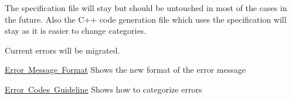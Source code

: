 The specification file will stay but should be untouched in most of the cases in the future. Also the C++ code generation file which uses the specification will stay as it is easier to change categories.

Current errors will be migrated.


\begin{DoxyItemize}
\item \mbox{\hyperlink{doc_decisions_error_message_format_md}{Error Message Format}} Shows the new format of the error message
\item \mbox{\hyperlink{doc_dev_error-categorization_md}{Error Codes Guideline}} Shows how to categorize errors
\end{DoxyItemize}